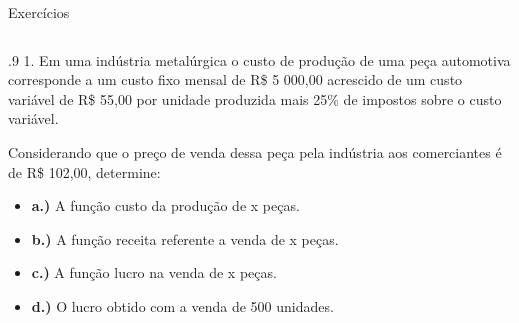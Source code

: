 \documentclass[aspectratio=169, t, 8pt]{beamer}
\begin{document}
    \begin{frame} {Exercícios} %
        \begin{columns}
            \centering
            \begin{column}{.9\textwidth}
                1. Em uma indústria metalúrgica o custo de produção de uma peça automotiva corresponde a um custo fixo mensal de R\$ 5 000,00 acrescido de um custo variável de R\$ 55,00 por unidade produzida mais 25\% de impostos sobre o custo variável.
                
                Considerando que o preço de venda dessa peça pela indústria aos comerciantes é de R\$ 102,00, determine:

                \vspace{1.2em}

                \begin{itemize}
                    \item {\bf a.)} A função custo da produção de x peças.
                    \item {\bf b.)} A função receita referente a venda de x peças.
                    \item {\bf c.)} A função lucro na venda de x peças.
                    \item {\bf d.)} O lucro obtido com a venda de 500 unidades. 
                \end{itemize}
            \end{column}    
        \end{columns}
    \end{frame}
\end{document}

